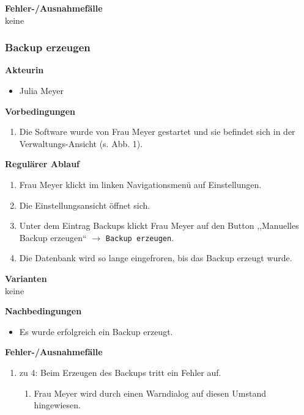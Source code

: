 \documentclass[fontsize=12pt,paper=a4,twoside]{scrartcl}
\begin{document}
\textbf{Fehler-/Ausnahmefälle}\\
keine

\subsubsection{Backup erzeugen}
\textbf{Akteurin}
\begin{itemize}
\item Julia Meyer
\end{itemize}
\vspace{5pt}

\textbf{Vorbedingungen}
\begin{enumerate}
\item Die Software wurde von Frau Meyer gestartet und sie befindet sich in der Verwaltungs-Ansicht (s. Abb. 1).
\end{enumerate}
\vspace{5pt}

\textbf{Regulärer Ablauf}
\begin{enumerate}
\item Frau Meyer klickt im linken Navigationsmenü auf Einstellungen.
\item Die Einstellungsansicht öffnet sich. 
\item Unter dem Eintrag Backups klickt Frau Meyer auf den Button ,,Manuelles Backup erzeugen`` $\rightarrow$ \texttt{Backup erzeugen}.
\item Die Datenbank wird so lange eingefroren, bis das Backup erzeugt wurde.
\end{enumerate}
\vspace{5pt}

\textbf{Varianten}\\
keine
\vspace{5pt}

\textbf{Nachbedingungen}
\begin{itemize}
\item Es wurde erfolgreich ein Backup erzeugt.
\end{itemize}
\vspace{5pt}

\textbf{Fehler-/Ausnahmefälle}
\begin{enumerate}
\item zu 4: Beim Erzeugen des Backups tritt ein Fehler auf.
	\begin{enumerate}[label=\arabic*.]
	\item Frau Meyer wird durch einen Warndialog auf diesen Umstand hingewiesen.
	\end{enumerate}
\end{enumerate}
\end{document}
